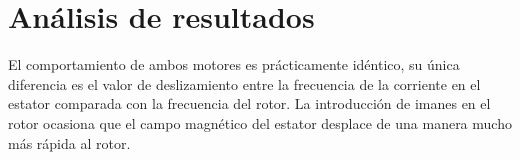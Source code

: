 \section{An\'alisis de resultados}
El comportamiento de ambos motores es pr\'acticamente id\'entico, su \'unica diferencia es el valor de
deslizamiento entre la frecuencia de la corriente en el estator comparada con la frecuencia del rotor.
La introducci\'on de imanes en el rotor ocasiona que el campo magn\'etico del estator desplace de una manera mucho 
m\'as r\'apida al rotor.